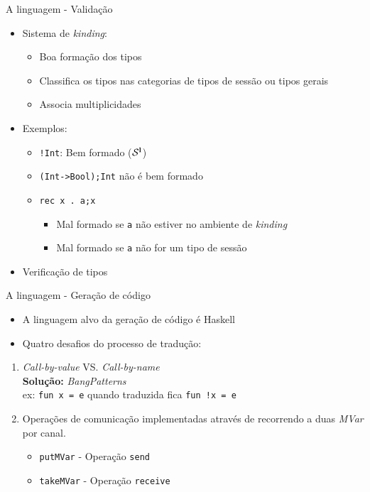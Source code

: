 \begin{frame}[fragile]{A linguagem - Validação}
  \begin{itemize}
  \item Sistema de \textit{kinding}:
    \begin{itemize}
    \item Boa formação dos tipos
    \item Classifica os tipos nas categorias de tipos de sessão ou tipos gerais
    \item Associa multiplicidades      
    \end{itemize}
  \item Exemplos:
    \begin{itemize}
    \item \lstinline|!Int|: Bem formado ($\mathcal S^{\mathbf{l}}$)
    \item \lstinline|(Int->Bool);Int| não é bem formado
    \item \lstinline|rec x . a;x|
      \begin{itemize}
      \item Mal formado se \lstinline|a| não estiver no ambiente de \textit{kinding}
      \item Mal formado se \lstinline|a| não for um tipo de sessão
      \end{itemize}
    \end{itemize}
    
  \item Verificação de tipos
  \end{itemize}
\end{frame}
  
\begin{frame}[fragile]{A linguagem - Geração de código}
  \begin{itemize}
  \item A linguagem alvo da geração de código é Haskell
  \item Quatro desafios do processo de tradução:
  \end{itemize}
  \begin{enumerate}
    \item \textit{Call-by-value} VS. \textit{Call-by-name}\\
      \textbf{Solução:} \textit{BangPatterns}\\      
      ex: \lstinline|fun x = e| quando traduzida fica \lstinline|fun !x = e|
   \newline
 \item Operações de comunicação implementadas através de recorrendo a duas \textit{MVar} por canal.
   \begin{itemize}
   \item \lstinline[Haskell]|putMVar| - Operação \lstinline|send|
   \item \lstinline[Haskell]|takeMVar| - Operação \lstinline|receive|
   \end{itemize}
  \end{enumerate}

\end{frame}

